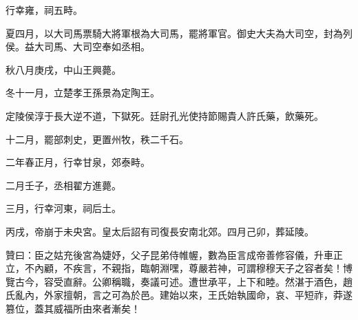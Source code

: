 \begin{pinyinscope}
行幸雍，祠五畤。

夏四月，以大司馬票騎大將軍根為大司馬，罷將軍官。御史大夫為大司空，封為列侯。益大司馬、大司空奉如丞相。

秋八月庚戌，中山王興薨。

冬十一月，立楚孝王孫景為定陶王。

定陵侯淳于長大逆不道，下獄死。廷尉孔光使持節賜貴人許氏藥，飲藥死。

十二月，罷部刺史，更置州牧，秩二千石。

二年春正月，行幸甘泉，郊泰畤。

二月壬子，丞相翟方進薨。

三月，行幸河東，祠后土。

丙戌，帝崩于未央宮。皇太后詔有司復長安南北郊。四月己卯，葬延陵。

贊曰：臣之姑充後宮為婕妤，父子昆弟侍帷幄，數為臣言成帝善修容儀，升車正立，不內顧，不疾言，不親指，臨朝淵嘿，尊嚴若神，可謂穆穆天子之容者矣！博覽古今，容受直辭。公卿稱職，奏議可述。遭世承平，上下和睦。然湛于酒色，趙氏亂內，外家擅朝，言之可為於邑。建始以來，王氏始執國命，哀、平短祚，莽遂篡位，蓋其威福所由來者漸矣！


\end{pinyinscope}
